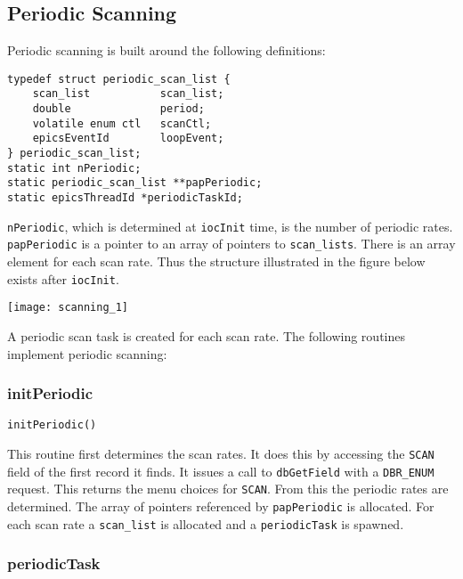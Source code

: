 \subsection{Periodic Scanning}

Periodic scanning is built around the following definitions:

\begin{verbatim}
typedef struct periodic_scan_list {
    scan_list           scan_list;
    double              period;
    volatile enum ctl   scanCtl;
    epicsEventId        loopEvent;
} periodic_scan_list;
static int nPeriodic;
static periodic_scan_list **papPeriodic;
static epicsThreadId *periodicTaskId;
\end{verbatim}

\verb|nPeriodic|, which is determined at \verb|iocInit| time, is the number of periodic rates.
\verb|papPeriodic| is a pointer to an array of pointers to \verb|scan_lists|.
There is an array element for each scan rate.
Thus the structure illustrated in the figure below exists after \verb|iocInit|.

\begin{center}
\texttt{[image: scanning\_1]}
\end{center}

A periodic scan task is created for each scan rate.
The following routines implement periodic scanning:

\subsubsection{initPeriodic}

\begin{verbatim}
initPeriodic()
\end{verbatim}

This routine first determines the scan rates.
It does this by accessing the \verb|SCAN| field of the first record it finds.
It issues a call to \verb|dbGetField| with a \verb|DBR_ENUM| request.
This returns the menu choices for \verb|SCAN|.
From this the periodic rates are determined.
The array of pointers referenced by \verb|papPeriodic| is allocated.
For each scan rate a \verb|scan_list| is allocated and a \verb|periodicTask| is spawned.

\subsubsection{periodicTask}

